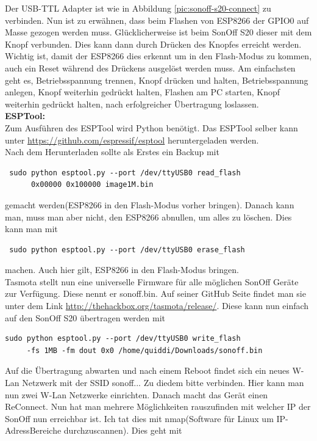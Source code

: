 \documentclass[11pt,fleqn]{book} %
\numberwithin{equation}{section} %
\numberwithin{figure}{section} %
\numberwithin{table}{section} %
\begin{document}
Der USB-TTL Adapter ist wie in Abbildung \ref{pic:sonoff-s20-connect} zu verbinden. Nun ist zu erwähnen, dass beim Flashen von ESP8266 der GPIO0 auf Masse gezogen werden muss. Glücklicherweise ist beim SonOff S20 dieser mit dem Knopf verbunden. Dies kann dann durch Drücken des Knopfes erreicht werden. Wichtig ist, damit der ESP8266 dies erkennt um in den Flash-Modus zu kommen, auch ein Reset während des Drückens ausgelöst werden muss. Am einfachsten geht es, Betriebsspannung trennen, Knopf drücken und halten, Betriebsspannung anlegen, Knopf weiterhin gedrückt halten, Flashen am PC starten, Knopf weiterhin gedrückt halten, nach erfolgreicher Übertragung loslassen.\\
\textbf{ESPTool:}\\
Zum Ausführen des ESPTool wird Python benötigt. Das ESPTool selber kann unter \url{https://github.com/espressif/esptool} heruntergeladen werden.\\ 
Nach dem Herunterladen sollte als Erstes ein Backup mit
\begin{lstlisting}
 sudo python esptool.py --port /dev/ttyUSB0 read_flash 
      0x00000 0x100000 image1M.bin
\end{lstlisting}
gemacht werden(ESP8266 in den Flash-Modus vorher bringen). Danach kann man, muss man aber nicht, den ESP8266 abnullen, um alles zu löschen. Dies kann man mit
\begin{lstlisting}
 sudo python esptool.py --port /dev/ttyUSB0 erase_flash
\end{lstlisting}
machen. Auch hier gilt, ESP8266 in den Flash-Modus bringen.\\
Tasmota stellt nun eine universelle Firmware für alle möglichen SonOff Geräte zur Verfügung. Diese nennt er \glqq sonoff.bin\grqq. Auf seiner GitHub Seite findet man sie unter dem Link \url{http://thehackbox.org/tasmota/release/}. Diese kann nun einfach auf den SonOff S20 übertragen werden mit 
\begin{lstlisting}
sudo python esptool.py --port /dev/ttyUSB0 write_flash 
     -fs 1MB -fm dout 0x0 /home/quiddi/Downloads/sonoff.bin 
\end{lstlisting}
Auf die Übertragung abwarten und nach einem Reboot findet sich ein neues W-Lan Netzwerk mit der SSID sonoff... Zu diedem bitte verbinden. Hier kann man nun zwei W-Lan Netzwerke einrichten. Danach macht das Gerät einen ReConnect. Nun hat man mehrere Möglichkeiten rauszufinden mit welcher IP der SonOff nun erreichbar ist. Ich tat dies mit nmap(Software für Linux um IP-AdressBereiche durchzuscannen). Dies geht mit 
\end{document}
